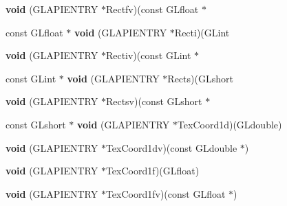 \begin{DoxyCompactItemize}
\item 
\mbox{\label{struct_____g_ldispatch_table_rec_a4f06035939701e3d35b51a19c0fa96fd}} 
{\bfseries void} (G\+L\+A\+P\+I\+E\+N\+T\+RY $\ast$Rectfv)(const G\+Lfloat $\ast$
\item 
\mbox{\label{struct_____g_ldispatch_table_rec_ad40daf54b275a75092d79af5ebfd1599}} 
const G\+Lfloat $\ast$ {\bfseries void} (G\+L\+A\+P\+I\+E\+N\+T\+RY $\ast$Recti)(G\+Lint
\item 
\mbox{\label{struct_____g_ldispatch_table_rec_aa454018e4c5e5188b2e74b2ec32aaec3}} 
{\bfseries void} (G\+L\+A\+P\+I\+E\+N\+T\+RY $\ast$Rectiv)(const G\+Lint $\ast$
\item 
\mbox{\label{struct_____g_ldispatch_table_rec_a2f83f01581c724274f9d9613e87863a7}} 
const G\+Lint $\ast$ {\bfseries void} (G\+L\+A\+P\+I\+E\+N\+T\+RY $\ast$Rects)(G\+Lshort
\item 
\mbox{\label{struct_____g_ldispatch_table_rec_a7015d083071ff347b642c854a12df6a8}} 
{\bfseries void} (G\+L\+A\+P\+I\+E\+N\+T\+RY $\ast$Rectsv)(const G\+Lshort $\ast$
\item 
\mbox{\label{struct_____g_ldispatch_table_rec_aabb687e815c2c8dee6503d25c7c161b7}} 
const G\+Lshort $\ast$ {\bfseries void} (G\+L\+A\+P\+I\+E\+N\+T\+RY $\ast$Tex\+Coord1d)(G\+Ldouble)
\item 
\mbox{\label{struct_____g_ldispatch_table_rec_a6772ece536635e92960c12c075fb503d}} 
{\bfseries void} (G\+L\+A\+P\+I\+E\+N\+T\+RY $\ast$Tex\+Coord1dv)(const G\+Ldouble $\ast$)
\item 
\mbox{\label{struct_____g_ldispatch_table_rec_a7f59eb210c825439ad0484fdc6985dbe}} 
{\bfseries void} (G\+L\+A\+P\+I\+E\+N\+T\+RY $\ast$Tex\+Coord1f)(G\+Lfloat)
\item 
\mbox{\label{struct_____g_ldispatch_table_rec_abe3a2ffcf1fa31f93af1d050e1db7002}} 
{\bfseries void} (G\+L\+A\+P\+I\+E\+N\+T\+RY $\ast$Tex\+Coord1fv)(const G\+Lfloat $\ast$)

\end{DoxyCompactItemize}
